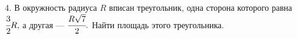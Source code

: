 4. В окружность радиуса $R$ вписан треугольник, одна сторона которого равна $\cfrac{3}{2}R,$ а другая --- $\cfrac{R\sqrt{7}}{2}.$ Найти площадь этого треугольника.\\
